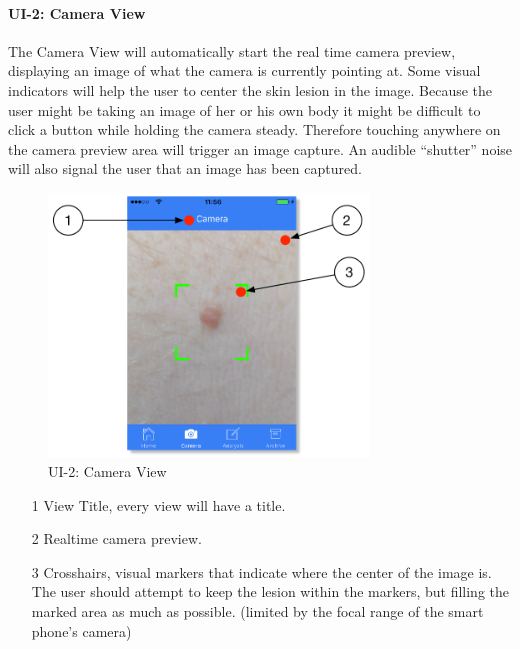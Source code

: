             \paragraph{UI-2: Camera View}

            The Camera View will automatically start the real time camera preview, displaying an image of what the camera is currently pointing at. Some visual indicators will help the user to center the skin lesion in the image. Because the user might be taking an image of her or his own body it might be difficult to click a button while holding the camera steady. Therefore touching anywhere on the camera preview area will trigger an image capture. An audible “shutter” noise will also signal the user that an image has been captured.

                \begin{figure}[H]
                    \centering
                    \includegraphics[height=7cm]{assets/GUI/CAMERA_01.pdf}
                    \caption{UI-2: Camera View}
                    \label{fig:ui-2}
                \end{figure}

                \begin{itemize}
                    \item[1] View Title, every view will have a title.
                    \item[2] Realtime camera preview.
                    \item[3] Crosshairs, visual markers that indicate where the center of the image is. The user should attempt to keep the lesion within the markers, but filling the marked area as much as possible. (limited by the focal range of the smart phone’s camera)

                \end{itemize}

